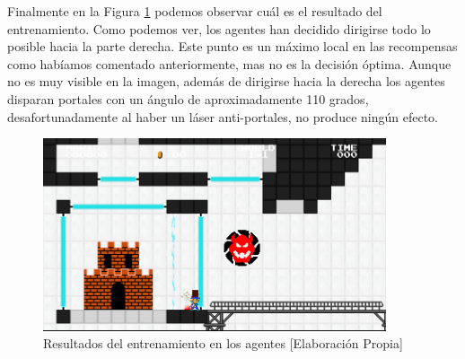 Finalmente en la Figura \ref {fig:entrenados} podemos observar cuál es el resultado del entrenamiento. Como podemos ver, los agentes han decidido dirigirse todo lo posible hacia la parte derecha. Este punto es un máximo local en las recompensas como habíamos comentado anteriormente, mas no es la decisión óptima. Aunque no es muy visible en la imagen, además de dirigirse hacia la derecha los agentes disparan portales con un ángulo de aproximadamente 110 grados, desafortunadamente al haber un láser anti-portales, no produce ningún efecto.
\begin{figure}[ht]
    \centering
    \includegraphics[width=0.9\textwidth]{img/entrenados.png}
    \caption{Resultados del entrenamiento en los agentes [Elaboración Propia]}
    \label{fig:entrenados}
\end{figure}